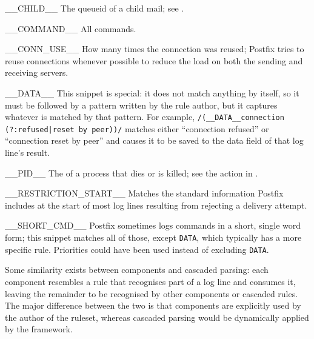 \begin{eqlist}

    \squeezeitems{}

    \item [\_\_CHILD\_\_]  The queueid of a child mail; see
        .

    \item [\_\_COMMAND\_\_]  All  commands.

    \item [\_\_CONN\_USE\_\_]  How many times the connection was reused;
        Postfix tries to reuse connections whenever possible to reduce the
        load on both the sending and receiving servers.

    \item [\_\_DATA\_\_]  This snippet is special: it does not match
        anything by itself, so it must be followed by a pattern written by
        the rule author, but it captures whatever is matched by that
        pattern.  For example, \verb!/(__DATA__connection! \newline{}
        \tab{}\verb!(?:refused|reset by peer))/! matches either
        ``connection refused'' or ``connection reset by peer'' and causes
        it to be saved to the data field of that log line's result.

    \item [\_\_PID\_\_]  The  of a  process that
        dies or is killed; see the  action in
        .

    \item [\_\_RESTRICTION\_START\_\_]  Matches the standard information
        Postfix includes at the start of most log lines resulting from
        rejecting a delivery attempt.

    \item [\_\_SHORT\_CMD\_\_]  Postfix sometimes logs 
        commands in a short, single word form; this snippet matches all of
        those, except \texttt{DATA}, which typically has a more specific
        rule.  Priorities could have been used instead of excluding
        \texttt{DATA}.


\end{eqlist}

Some similarity exists between  components and cascaded
parsing: each  component resembles a rule that recognises
part of a log line and consumes it, leaving the remainder to be recognised
by other components or cascaded rules.  The major difference between the
two is that  components are explicitly used by the author of
the ruleset, whereas cascaded parsing would be dynamically applied by the
framework.

